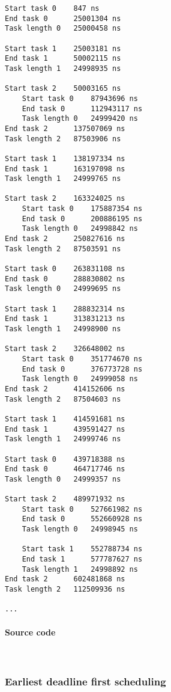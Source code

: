 \begin{lstlisting}[keywordstyle=\color{black}, caption={Output (reformatted) RM 2\textsuperscript{nd} set}]
Start task 0	847 ns
End task 0		25001304 ns
Task length 0	25000458 ns

Start task 1	25003181 ns
End task 1		50002115 ns
Task length 1	24998935 ns

Start task 2	50003165 ns
	Start task 0	87943696 ns
	End task 0		112943117 ns
	Task length 0	24999420 ns
End task 2		137507069 ns
Task length 2	87503906 ns

Start task 1	138197334 ns
End task 1		163197098 ns
Task length 1	24999765 ns

Start task 2	163324025 ns
	Start task 0	175887354 ns
	End task 0		200886195 ns
	Task length 0	24998842 ns
End task 2		250827616 ns
Task length 2	87503591 ns

Start task 0	263831108 ns
End task 0		288830802 ns
Task length 0	24999695 ns

Start task 1	288832314 ns
End task 1		313831213 ns
Task length 1	24998900 ns

Start task 2	326648002 ns
	Start task 0	351774670 ns
	End task 0		376773728 ns
	Task length 0	24999058 ns
End task 2		414152606 ns
Task length 2	87504603 ns

Start task 1	414591681 ns
End task 1		439591427 ns
Task length 1	24999746 ns

Start task 0	439718388 ns
End task 0		464717746 ns
Task length 0	24999357 ns

Start task 2	489971932 ns
	Start task 0	527661982 ns
	End task 0		552660928 ns
	Task length 0	24998945 ns

	Start task 1	552788734 ns
	End task 1		577787627 ns
	Task length 1	24998892 ns
End task 2		602481868 ns
Task length 2	112509936 ns

...
\end{lstlisting}

\paragraph{Source code}
\



\subsubsection{Earliest deadline first scheduling}
